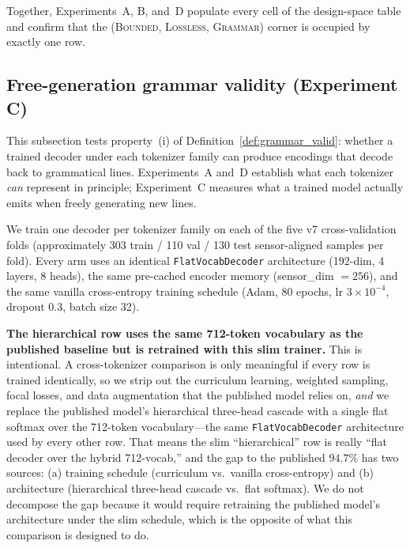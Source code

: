 \documentclass[11pt]{article}
\begin{document}
Together, Experiments~A, B, and~D populate every cell of the design-space table and confirm that the (\textsc{Bounded}, \textsc{Lossless}, \textsc{Grammar}) corner is occupied by exactly one row.

\subsection{Free-generation grammar validity (Experiment C)}
\label{sec:exp_c}

This subsection tests property~(i) of Definition~\ref{def:grammar_valid}: whether a trained decoder under each tokenizer family can produce encodings that decode back to grammatical lines. Experiments~A and~D establish what each tokenizer \emph{can} represent in principle; Experiment~C measures what a trained model actually emits when freely generating new lines.

We train one decoder per tokenizer family on each of the five v7 cross-validation folds (approximately 303 train / 110 val / 130 test sensor-aligned samples per fold). Every arm uses an identical \texttt{FlatVocabDecoder} architecture (192-dim, 4 layers, 8 heads), the same pre-cached encoder memory (sensor\_dim $= 256$), and the same vanilla cross-entropy training schedule (Adam, 80 epochs, lr $3{\times}10^{-4}$, dropout 0.3, batch size 32).

\textbf{The hierarchical row uses the same 712-token vocabulary as the published baseline but is retrained with this slim trainer.} This is intentional. A cross-tokenizer comparison is only meaningful if every row is trained identically, so we strip out the curriculum learning, weighted sampling, focal losses, and data augmentation that the published model relies on, \emph{and} we replace the published model's hierarchical three-head cascade with a single flat softmax over the 712-token vocabulary---the same \texttt{FlatVocabDecoder} architecture used by every other row. That means the slim ``hierarchical'' row is really ``flat decoder over the hybrid 712-vocab,'' and the gap to the published $94.7\%$ has two sources: (a) training schedule (curriculum vs.\ vanilla cross-entropy) and (b) architecture (hierarchical three-head cascade vs.\ flat softmax). We do not decompose the gap because it would require retraining the published model's architecture under the slim schedule, which is the opposite of what this comparison is designed to do.
\end{document}
